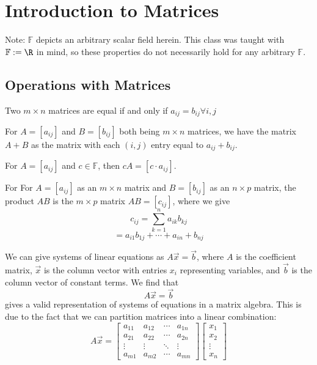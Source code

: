 \chapter{Introduction to Matrices}
Note: $\mathbb{F}$ depicts an arbitrary scalar field herein. This class was taught with $\mathbb{F}:=\R$ in mind, so these properties do not necessarily hold for any arbitrary $\mathbb{F}$.
\section{Operations with Matrices}
\begin{definition}\label{def:1}
	Two $m\times n$ matrices are equal if and only if $a_{ij}=b_{ij}\forall i,j$
\end{definition}
\begin{definition}\label{def:2}
	For $A=[a_{ij}]$ and $B=[b_{ij}]$ both being $m\times n$ matrices, we have the matrix $A+B$ as the matrix with each $(i,j)$ entry equal to $a_{ij}+b_{ij}$.
\end{definition}
\begin{definition}\label{def:3}
	For $A=[a_{ij}]$ and $c\in\mathbb{F}$, then $cA=[c\cdot a_{ij}]$.
\end{definition}
\begin{definition}\label{def:4}
For For $A=[a_{ij}]$ as an $m\times n$ matrix and $B=[b_{ij}]$ as an $n\times p$ matrix, the product $AB$ is the $m\times p$ matrix $AB=[c_{ij}]$, where we give
$$c_{ij}=\sum_{k=1}^n a_{ik}b_{kj}$$
$$=a_{i1}b_{1j}+\cdots+a_{in}+b_{nj}$$	
\end{definition}
We can give systems of linear equations as $A\vec{x}=\vec{b}$, where $A$ is the coefficient matrix, $\vec{x}$ is the column vector with entries $x_i$ representing variables, and $\vec{b}$ is the column vector of constant terms. We find that
$$A\vec{x}=\vec{b}$$
gives a valid representation of systems of equations in a matrix algebra. This is due to the fact that we can partition matrices into a linear combination:
$$A\vec{x}=\begin{bmatrix}
	a_{11}&a_{12}&\cdots&a_{1n}\\
	a_{21}&a_{22}&\cdots&a_{2n}\\
	\vdots&\vdots&\ddots&\vdots\\
	a_{m1}&a_{m2}&\cdots&a_{mn}
\end{bmatrix}\begin{bmatrix}
x_1\\x_2\\\vdots\\x_n
\end{bmatrix}$$
